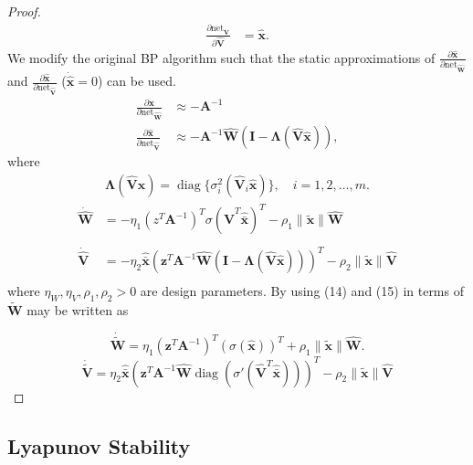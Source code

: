 \documentclass[11pt, a4paper]{article}
\newcommand{\xtilde}{\tilde{\bm{x}}}
\newcommand{\xhatbar}{\hat{\bar{\bm{x}}}}
\newcommand{\What}{\hat{\mathbf{W}}}
\newcommand{\Vhat}{\hat{\mathbf{V}}}
\newcommand{\diag}{\operatorname{diag}}
\begin{document}
\begin{proof}
\begin{align}
    \frac{\partial \text{net}_{\hat{\mathbf{V}}}}{\partial \hat{\mathbf{V}}} &= \hat{\bm{x}}.
\end{align}
We modify the original BP algorithm such that the static approximations of $\frac{\partial \hat{\bm{x}}}{\partial \text{net}_{\hat{\mathbf{W}}}}$ and $\frac{\partial \hat{\bm{x}}}{\partial \text{net}_{\hat{\mathbf{V}}}}$ ($\dot{\hat{\bm{x}}} = 0$) can be used.
\begin{align}
    \frac{\partial \hat{\bm{x}}}{\partial \text{net}_{\hat{\mathbf{W}}}} &\approx -\mathbf{A}^{-1} \nonumber \\
    \frac{\partial \hat{\bm{x}}}{\partial \text{net}_{\hat{\mathbf{V}}}} &\approx -\mathbf{A}^{-1}\hat{\mathbf{W}}(\mathbf{I} - \mathbf{\Lambda}(\hat{\mathbf{V}}\hat{\bm{x}})), 
\end{align}
where
\begin{align}
    \mathbf{\Lambda}(\hat{\mathbf{V}}\hat{\bm{x}}) = \diag\{\sigma_i^2(\hat{\mathbf{V}}_i\hat{\bm{x}})\}, \quad i=1,2,\dots,m.
\end{align}
\begin{align}
    \dot{\What} &= -\eta_1 \left(z^{T} \bm{A}^{-1}  \right)^{T} \sigma(\Vhat^T\xhatbar)^T - \rho_1 \|\xtilde\| \What\\\label{eq:update_W_robust}\\
    \dot{\Vhat} &= -\eta_2 \xhatbar \left( \bm{z}^T \bm{A}^{-1} \What (\mathbf{I} - \mathbf{\Lambda}(\hat{\mathbf{V}}\hat{\bm{x}})) \right)^T - \rho_2 \|\xtilde\| \Vhat \\\label{eq:update_V_robust}
\end{align}
where $\eta_W, \eta_V, \rho_1, \rho_2 > 0$ are design parameters. By using (14) and (15) in terms of $\tilde{\mathbf{W}}$ may be written as

\begin{equation}
    \dot{\tilde{\mathbf{W}}} = \eta_1 ({\bm{z}}^T \mathbf{A}^{-1})^T (\sigma(\hat{\bm{x}}))^T + \rho_1\|\tilde{\bm{x}}\|\hat{\mathbf{W}}.
\end{equation}
\begin{equation}
    \dot{\tilde{\mathbf{V}}} = \eta_2 \xhatbar \left( \bm{z}^T \bm{A}^{-1} \What \diag(\sigma'(\Vhat^T\xhatbar)) \right)^T - \rho_2 \|\xtilde\| \Vhat
\end{equation}
\end{proof}
\subsection{Lyapunov Stability}
\end{document}
